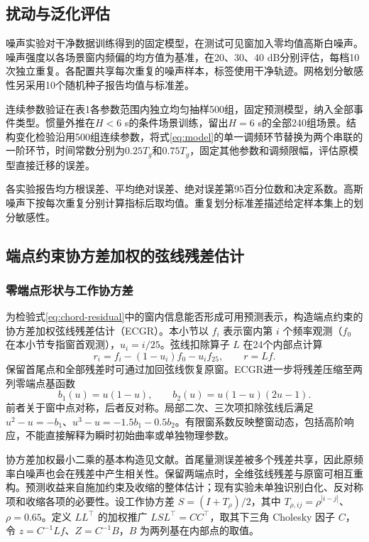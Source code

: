 \documentclass[UTF8,a4paper,11pt]{ctexart}
\begin{document}
\subsection{扰动与泛化评估}
噪声实验对干净数据训练得到的固定模型，在测试可见窗加入零均值高斯白噪声。噪声强度以各场景窗内频偏的均方值为基准，在20、30、40 dB分别评估，每档10次独立重复。各配置共享每次重复的噪声样本，标签使用干净轨迹。网格划分敏感性另采用10个随机种子报告均值与标准差。

连续参数验证在表1各参数范围内独立均匀抽样500组，固定预测模型，纳入全部事件类型。惯量外推在$H<6$ s的条件场景训练，留出$H=6$ s的全部240组场景。结构变化检验沿用500组连续参数，将式\eqref{eq:model}的单一调频环节替换为两个串联的一阶环节，时间常数分别为$0.25T_g$和$0.75T_g$，固定其他参数和调频限幅，评估原模型直接迁移的误差。

各实验报告均方根误差、平均绝对误差、绝对误差第95百分位数和决定系数。高斯噪声下按每次重复分别计算指标后取均值。重复划分标准差描述给定样本集上的划分敏感性。

\subsection{端点约束协方差加权的弦线残差估计}
\subsubsection{零端点形状与工作协方差}
为检验式\eqref{eq:chord-residual}中的窗内信息能否形成可用预测表示，构造端点约束的协方差加权弦线残差估计（ECGR）。本小节以 \(f_i\) 表示窗内第 \(i\) 个频率观测（\(f_0\) 在本小节专指窗首观测），\(u_i=i/25\)。弦线扣除算子 \(L\) 在24个内部点计算
\[
r_i=f_i-(1-u_i)f_0-u_i f_{25},\qquad r=Lf .
\]
保留首尾点和全部残差时可通过加回弦线恢复原窗。ECGR进一步将残差压缩至两列零端点基函数
\[
b_1(u)=u(1-u),\qquad b_2(u)=u(1-u)(2u-1).
\]
前者关于窗中点对称，后者反对称。局部二次、三次项扣除弦线后满足 \(u^2-u=-b_1\)、\(u^3-u=-1.5b_1-0.5b_2\)。有限窗系数反映整窗动态，包括高阶响应，不能直接解释为瞬时初始曲率或单独物理参数。

协方差加权最小二乘的基本构造见文献\cite{aitken1936}。首尾量测误差被多个残差共享，因此原频率白噪声也会在残差中产生相关性。保留两端点时，全维弦线残差与原窗可相互重构。预测收益来自施加约束及收缩的整体估计；现有实验未单独识别白化、反对称项和收缩各项的必要性。设工作协方差 \(S=(I+T_\rho)/2\)，其中 \(T_{\rho,ij}=\rho^{|i-j|}\)、\(\rho=0.65\)。定义 \(LL^\top\) 的加权推广 \(LSL^\top=CC^\top\)，取其下三角 Cholesky 因子 \(C\)，令 \(z=C^{-1}Lf\)、\(Z=C^{-1}B\)，\(B\) 为两列基在内部点的取值。
\end{document}
